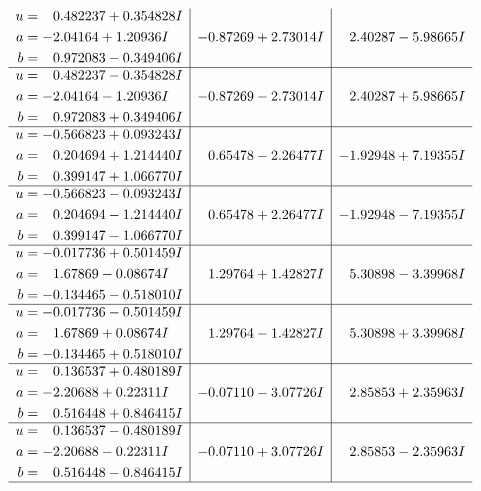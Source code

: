 \documentclass[1p]{elsarticle_modified}
\theoremstyle{definition}
\begin{document}
$$\begin{array}{c|c|c}
\begin{aligned}
u &= \phantom{-}0.482237 + 0.354828 I \\
a &= -2.04164 + 1.20936 I \\
b &= \phantom{-}0.972083 - 0.349406 I\end{aligned}
 & -0.87269 + 2.73014 I & \phantom{-}2.40287 - 5.98665 I \\ \hline\begin{aligned}
u &= \phantom{-}0.482237 - 0.354828 I \\
a &= -2.04164 - 1.20936 I \\
b &= \phantom{-}0.972083 + 0.349406 I\end{aligned}
 & -0.87269 - 2.73014 I & \phantom{-}2.40287 + 5.98665 I \\ \hline\begin{aligned}
u &= -0.566823 + 0.093243 I \\
a &= \phantom{-}0.204694 + 1.214440 I \\
b &= \phantom{-}0.399147 + 1.066770 I\end{aligned}
 & \phantom{-}0.65478 - 2.26477 I & -1.92948 + 7.19355 I \\ \hline\begin{aligned}
u &= -0.566823 - 0.093243 I \\
a &= \phantom{-}0.204694 - 1.214440 I \\
b &= \phantom{-}0.399147 - 1.066770 I\end{aligned}
 & \phantom{-}0.65478 + 2.26477 I & -1.92948 - 7.19355 I \\ \hline\begin{aligned}
u &= -0.017736 + 0.501459 I \\
a &= \phantom{-}1.67869 - 0.08674 I \\
b &= -0.134465 - 0.518010 I\end{aligned}
 & \phantom{-}1.29764 + 1.42827 I & \phantom{-}5.30898 - 3.39968 I \\ \hline\begin{aligned}
u &= -0.017736 - 0.501459 I \\
a &= \phantom{-}1.67869 + 0.08674 I \\
b &= -0.134465 + 0.518010 I\end{aligned}
 & \phantom{-}1.29764 - 1.42827 I & \phantom{-}5.30898 + 3.39968 I \\ \hline\begin{aligned}
u &= \phantom{-}0.136537 + 0.480189 I \\
a &= -2.20688 + 0.22311 I \\
b &= \phantom{-}0.516448 + 0.846415 I\end{aligned}
 & -0.07110 - 3.07726 I & \phantom{-}2.85853 + 2.35963 I \\ \hline\begin{aligned}
u &= \phantom{-}0.136537 - 0.480189 I \\
a &= -2.20688 - 0.22311 I \\
b &= \phantom{-}0.516448 - 0.846415 I\end{aligned}
 & -0.07110 + 3.07726 I & \phantom{-}2.85853 - 2.35963 I\\
 \hline 
 \end{array}$$\newpage\newpage\renewcommand{\arraystretch}{1}
\end{document}
